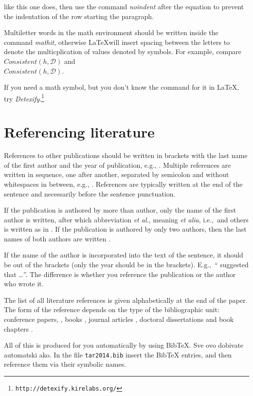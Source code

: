 \documentclass[10pt, a4paper]{article}
\begin{document}
\noindent like this one does, then use the command \emph{noindent} after the equation to prevent the indentation of the row starting the paragraph. 

Multiletter words in the math environment should be written inside the command \emph{mathit}, otherwise \LaTeX will insert spacing between the letters to denote the multicplication of values denoted by symbols. For example, compare
$\mathit{Consistent}(h,\mathcal{D})$ and\\
$Consistent(h,\mathcal{D})$.

If you need a math symbol, but you don't know the command for it in \LaTeX, try
\emph{Detexify}.\footnote{\texttt{http://detexify.kirelabs.org/}}

\section{Referencing literature}

References to other publications should be written in brackets with the last name of the first author and the year of publication, e.g., \citep{chomsky-73}.  Multiple references are written in sequence, one after another, separated by semicolon and without whitespaces in between, e.g., \citep{chomsky-73,chave-64,feigl-58}. References are typically written at the end of the sentence and necessarily before the sentence punctuation.

If the publication is authored by more than author, only the name of the first author is written, after which abbreviation \emph{et al.}, meaning \emph{et alia}, i.e.,~and others is written as in \citep{johnson-etc}. If the publication is authored by only two authors, then the last names of both authors are written \citep{johnson-howells}.

If the name of the author is incorporated into the text of the sentence, it should be out of the brackets (only the year should be in the brackets). E.g.,~``\citet{chomsky-73}
suggested that \dots''. The difference is whether you reference the publication or the author who wrote it. 

The list of all literature references is given alphabetically at the end of the paper. The form of the reference depends on the type of the bibliographic unit: conference papers,
\citep{chave-64}, books \citep{butcher-81}, journal articles
\citep{howells-51}, doctoral dissertations \citep{croft-78} and book chapters \citep{feigl-58}. 

All of this is produced for you automatically by using BibTeX. Sve ovo dobivate automatski ako. In the file \texttt{tar2014.bib} insert the BibTeX entries, and then reference them via their symbolic names.
\end{document}
